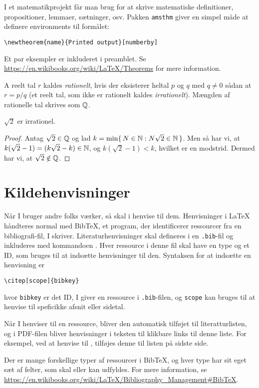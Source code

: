I et matematikprojekt får man brug for at skrive matematiske definitioner, propositioner, lemmaer, sætninger, osv.
Pakken \texttt{amsthm} giver en simpel måde at definere environments til formålet:
%
\begin{verbatim}
\newtheorem{name}{Printed output}[numberby]
\end{verbatim}
%
Et par eksempler er inkluderet i preamblet.
Se \url{https://en.wikibooks.org/wiki/LaTeX/Theorems} for mere information.
%
\begin{defn}
  A reelt tal \(r\) kaldes \emph{rationelt}, hvis der eksisterer heltal \(p\) og \(q\) med \(q \neq 0\) sådan at \(r = p/q\)
  (et reelt tal, som ikke er rationelt kaldes \emph{irrationelt}).
  Mængden af rationelle tal skrives som \(\mathbb{Q}\).
\end{defn}
%
\begin{thm}
  \(\sqrt{2}\) er irrationel.
\end{thm}
%
\begin{proof}
  Antag \(\sqrt{2} \in \mathbb{Q}\) og lad \(k = \min\{\, N \in \mathbb{N} : N\sqrt{2} \in \mathbb{N} \,\}\).
  Men så har vi, at \(k (\sqrt{2} - 1) = (k\sqrt{2} - k) \in \mathbb{N}\), og \(k(\sqrt{2} - 1) < k\), hvilket er en modstrid.
  Dermed har vi, at \(\sqrt{2} \notin \mathbb{Q}\).
\end{proof}


\section{Kildehenvisninger}
\label{sec:citations}

Når I bruger andre folks værker, så skal i henvise til dem.
Henvisninger i \LaTeX{} håndteres normal med BibTeX, et program, der identificerer ressourcer fra en bibliografi-fil, I skriver.
Literaturhenvisninger skal defineres i en \texttt{.bib}-fil og inkluderes med kommandoen \verb!!.
Hver ressource i denne fil skal have en type og et ID, som bruges til at indsætte henvisninger til den.
Syntaksen for at indsætte en henvisning er
%
\begin{verbatim}
\citep[scope]{bibkey}
\end{verbatim}
%
hvor \texttt{bibkey} er det ID, I giver en ressource i \texttt{.bib}-filen, og \texttt{scope} kan bruges til at henvise til speficikke afsnit eller sidetal.

Når I henviser til en ressource, bliver den automatisk tilføjet til literatturlisten, og i PDF-filen bliver henvisninger i teksten til klikbare links til denne liste.
For eksempel, ved at henvise til \citep[s. 104-110]{edpenn}, tilføjes denne til listen på sidste side.

Der er mange forskellige typer af ressourcer i BibTeX, og hver type har sit eget sæt af felter, som skal eller kan udfyldes.
For mere information, se \url{https://en.wikibooks.org/wiki/LaTeX/Bibliography_Management#BibTeX}.
